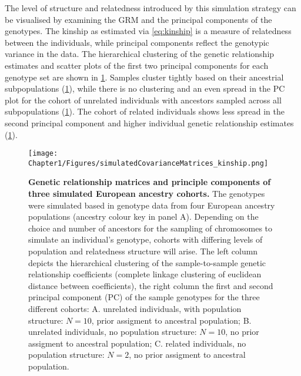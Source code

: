 The level of structure and relatedness introduced by this simulation strategy can be visualised by examining the GRM and the principal components of the genotypes. The kinship as estimated via \cref{eq:kinship} is a measure of relatedness between the individuals, while principal components reflect the genotypic variance in the data. The hierarchical clustering of the genetic relationship estimates and scatter plots of the first two principal components for each genotype set are shown in \cref{fig:kinship-matrices}. Samples cluster tightly based on their ancestrial subpopulations (\cref{fig:kinship-matrices}), while there is no clustering and an even spread in the PC plot for the cohort of unrelated individuals with ancestors sampled across all subpopulations (\cref{fig:kinship-matrices}). The cohort of related individuals shows less spread in the second principal component and higher individual genetic relationship  estimates (\cref{fig:kinship-matrices}).


\begin{figure}[htbp]
	\centering
	\texttt{[image: Chapter1/Figures/simulatedCovarianceMatrices\_kinship.png]}
	\caption[\textbf{Genetic relationship matrices and principal components of three simulated European ancestry cohorts.}]{\textbf{Genetic relationship matrices and principle components of three simulated European ancestry cohorts.} The genotypes were simulated based in genotype data from four European ancestry populations (ancestry colour key in panel A). Depending on the choice and number of ancestors for the sampling of chromosomes to simulate an individual's genotype, cohorts with differing levels of population and relatedness structure will arise. The left column depicts the hierarchical clustering of the sample-to-sample  genetic relationship coefficients (complete linkage clustering of euclidean distance between coefficients), the right column the first and second principal component (PC) of the sample genotypes for the three different cohorts: A. unrelated individuals, with population structure: \(N=10\), prior assigment to ancestral population; B. unrelated individuals, no population structure: \(N=10\), no prior assigment to ancestral population; C. related individuals, no population structure: \(N=2\), no prior assigment to ancestral population.}
 	\label{fig:kinship-matrices}
\end{figure}


